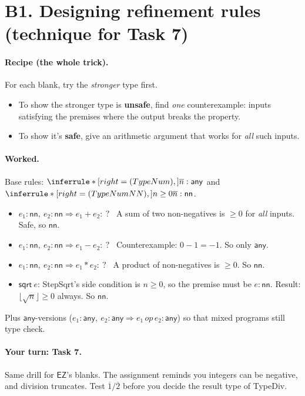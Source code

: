 \documentclass[11pt]{article}
\newcommand{\SQRT}[1]{\mathsf{sqrt}\ #1}
\newcommand{\NN}{\mathsf{nn}}
\newcommand{\ANY}{\mathsf{any}}
\newcommand{\num}[1]{\overline{#1}}
\begin{document}
\section*{B1. Designing refinement rules \hfill (technique for Task 7)}

\paragraph{Recipe (the whole trick).} For each blank, try the
\emph{stronger} type first.
\begin{itemize}
  \item To show the stronger type is \textbf{unsafe}, find \emph{one}
        counterexample: inputs satisfying the premises where the output
        breaks the property.
  \item To show it's \textbf{safe}, give an arithmetic argument that works
        for \emph{all} such inputs.
\end{itemize}

\paragraph{Worked.} Base rules:
$\Rule{TypeNum}{\strut}{\num n:\ANY}$ and
$\Rule{TypeNumNN}{n\ge0}{\num n:\NN}$.
\begin{itemize}
  \item $e_1:\NN,\ e_2:\NN \Rightarrow e_1+e_2:\ ?$ \
        A sum of two non-negatives is $\ge 0$ for \emph{all} inputs. Safe, so
        $\NN$.
  \item $e_1:\NN,\ e_2:\NN \Rightarrow e_1-e_2:\ ?$ \
        Counterexample: $0-1=-1$. So only $\ANY$.
  \item $e_1:\NN,\ e_2:\NN \Rightarrow e_1*e_2:\ ?$ \
        A product of non-negatives is $\ge0$. So $\NN$.
  \item $\SQRT{e}$: StepSqrt's side condition is $n\ge0$, so the premise
        must be $e:\NN$. Result: $\lfloor\sqrt n\rfloor\ge 0$ always. So
        $\NN$.
\end{itemize}
Plus $\ANY$-versions ($e_1:\ANY,\ e_2:\ANY\Rightarrow e_1\,op\,e_2:\ANY$) so
that mixed programs still type check.

\paragraph{Your turn: Task 7.} Same drill for $\mathsf{EZ}$'s blanks. The
assignment reminds you integers can be negative, and division truncates.
Test $\num1/\num2$ before you decide the result type of TypeDiv.
\end{document}
